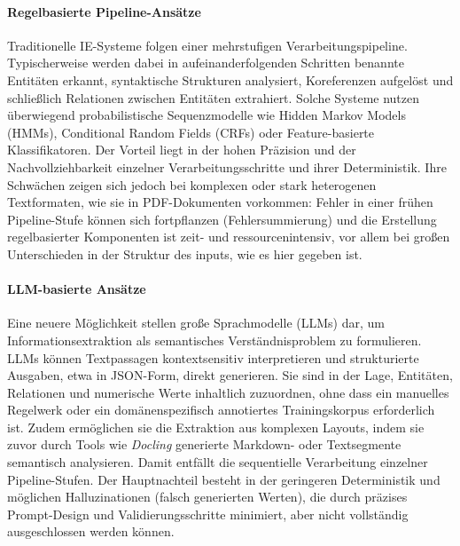 \paragraph{Regelbasierte Pipeline-Ansätze}
Traditionelle IE-Systeme folgen einer mehrstufigen Verarbeitungspipeline. 
Typischerweise werden dabei in aufeinanderfolgenden Schritten benannte Entitäten erkannt, syntaktische Strukturen analysiert,
Koreferenzen aufgelöst und schließlich Relationen zwischen Entitäten extrahiert. 
Solche Systeme nutzen überwiegend probabilistische Sequenzmodelle wie Hidden Markov Models (HMMs),
Conditional Random Fields (CRFs) oder Feature-basierte Klassifikatoren. \cite{Grishman2015}
Der Vorteil liegt in der hohen Präzision und der Nachvollziehbarkeit einzelner Verarbeitungsschritte und ihrer Deterministik. 
Ihre Schwächen zeigen sich jedoch bei komplexen oder stark heterogenen Textformaten, wie sie in PDF-Dokumenten vorkommen: 
Fehler in einer frühen Pipeline-Stufe können sich fortpflanzen (Fehlersummierung) 
und die Erstellung regelbasierter Komponenten ist zeit- und ressourcenintensiv, vor allem bei großen Unterschieden in der
Struktur des inputs, wie es hier gegeben ist. \cite{Grishman2015}

\paragraph{LLM-basierte Ansätze}
Eine neuere Möglichkeit stellen große Sprachmodelle (LLMs) dar, um Informationsextraktion als semantisches Verständnisproblem zu formulieren. 
LLMs können Textpassagen kontextsensitiv interpretieren und strukturierte Ausgaben, etwa in JSON-Form, direkt generieren. \cite{Nadeem2024}
Sie sind in der Lage, Entitäten, Relationen und numerische Werte inhaltlich zuzuordnen, ohne dass ein manuelles Regelwerk
oder ein domänenspezifisch annotiertes Trainingskorpus erforderlich ist. \cite{Filho2025}
Zudem ermöglichen sie die Extraktion aus komplexen Layouts, indem sie zuvor durch Tools wie \emph{Docling} generierte Markdown- oder Textsegmente semantisch analysieren. 
Damit entfällt die sequentielle Verarbeitung einzelner Pipeline-Stufen. \cite{Nadeem2024}
Der Hauptnachteil besteht in der geringeren Deterministik und möglichen Halluzinationen (falsch generierten Werten), 
die durch präzises Prompt-Design und Validierungsschritte minimiert, aber nicht vollständig ausgeschlossen werden können. \cite{Filho2025}


